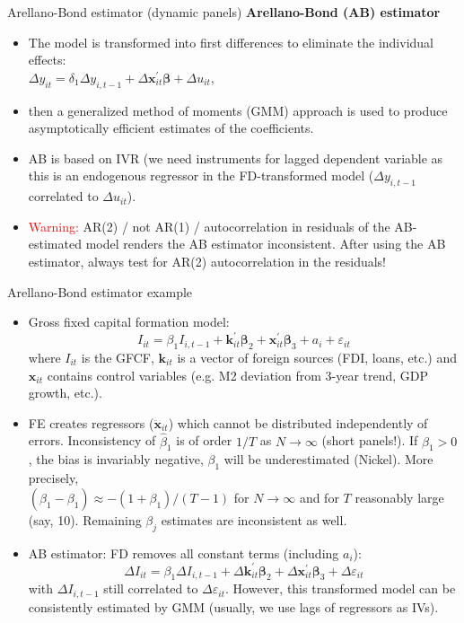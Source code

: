 \documentclass[usenames,dvipsnames]{beamer}
\begin{document}
\begin{frame}{Arellano-Bond estimator (dynamic panels)}
\textbf{Arellano-Bond (AB) estimator} \\ \medskip
\begin{itemize}
\item The model is transformed into first differences to eliminate the individual effects:\\
$\Delta y_{it} = \delta_1 \Delta y_{i,t-1} + \Delta \bm{x}^{\prime}_{it} \bm{\beta} + \Delta u_{it}$, 
\medskip
\item then a generalized method of moments (GMM) approach is used to produce asymptotically efficient estimates of the coefficients.
\medskip
\item AB is based on IVR (we need instruments for lagged dependent variable as this is an endogenous regressor in the FD-transformed model ($\Delta y_{i,t-1}$ correlated to $\Delta u_{it}$).
\medskip
\item \textcolor{red}{Warning:} AR(2) / not AR(1) / autocorrelation in residuals of the AB-estimated model renders the AB estimator inconsistent. After using the AB estimator, always test for AR(2) autocorrelation in the residuals!
\end{itemize}
\end{frame}
\begin{frame}{Arellano-Bond estimator example}
\small
\begin{itemize}
\item Gross fixed capital formation model:
$$
I_{it} = \beta_1 I_{i,t-1} + \bm{k}_{it}^{\prime} \bm{\beta}_2  + \bm{x}_{it}^{\prime} \bm{\beta}_3 
+ a_i +\varepsilon_{it}
$$
where $I_{it}$ is the GFCF, $\bm{k}_{it}$ is a vector of foreign sources (FDI, loans, etc.) and $\bm{x}_{it}$ contains control variables (e.g. M2 deviation from 3-year trend, GDP growth, etc.). 
\smallskip
\item FE creates regressors ($\ddot{\bm{x}}_{it}$) which cannot be distributed independently of errors. Inconsistency of $\hat{\beta}_1$ is of order $1/T$ as $N \rightarrow \infty$ (short panels!). If $\beta_1 > 0$, the bias is invariably negative, $\beta_1$ will be underestimated (Nickel). More precisely,\\ $(\hat{\beta}_1-\beta_1) \approx -(1 + \beta_1)/(T-1)$ for $N\rightarrow \infty$ and for $T$ reasonably large (say, 10). Remaining $\beta_j$ estimates are inconsistent as well.
\smallskip
\item AB estimator: FD removes all constant terms (including $a_i$):
$$
\Delta I_{it} = \beta_1 \Delta I_{i,t-1} + \Delta \bm{k}_{it}^{\prime} \bm{\beta}_2  + \Delta \bm{x}_{it}^{\prime} \bm{\beta}_3 
 + \Delta \varepsilon_{it}
$$
with $\Delta I_{i,t-1}$ still correlated to $\Delta \varepsilon_{it}$. However, this transformed model can be consistently estimated by GMM (usually, we use lags of regressors as IVs).
\end{itemize}
\end{frame}
\end{document}
